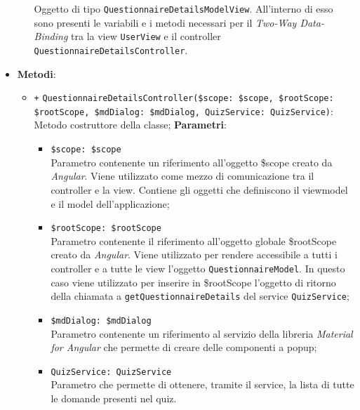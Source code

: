 \begin{itemize}
\begin{itemize}
		Oggetto di tipo \texttt{QuestionnaireDetailsModelView}. All'interno di esso sono presenti le variabili e i metodi necessari per il \textit{Two-Way Data-Binding} tra la view \texttt{UserView} e il controller \texttt{QuestionnaireDetailsController}.
	\end{itemize}
	\item \textbf{Metodi}:
	\begin{itemize}
		\item \texttt{+} \texttt{QuestionnaireDetailsController(\$scope: \$scope, \$rootScope: \$rootScope, \$mdDialog: \$mdDialog, QuizService: QuizService)}: \\ Metodo costruttore della classe;
		\textbf{Parametri}: 
		\begin{itemize}
			\item \texttt{\$scope: \$scope} \\
			Parametro contenente un riferimento all’oggetto \$scope creato da \textit{Angular}. Viene utilizzato come mezzo di comunicazione tra il controller e la view. Contiene gli oggetti che definiscono il viewmodel e il model dell’applicazione;
			\item \texttt{\$rootScope: \$rootScope} \\
			Parametro contenente il riferimento all'oggetto globale \$rootScope creato da \textit{Angular}. Viene utilizzato per rendere accessibile a tutti i controller e a tutte le view l'oggetto \texttt{QuestionnaireModel}. In questo caso viene utilizzato per inserire in \$rootScope l'oggetto di ritorno della chiamata a \texttt{getQuestionnaireDetails} del service \texttt{QuizService};	
			\item \texttt{\$mdDialog: \$mdDialog} \\
			Parametro contenente un riferimento al servizio della libreria \textit{Material for Angular} che permette di creare delle componenti a popup;
			\item \texttt{QuizService: QuizService}\\ Parametro che permette di ottenere, tramite il service, la lista di tutte le domande presenti nel quiz.
		\end{itemize}
		

\end{itemize}
\end{itemize}
